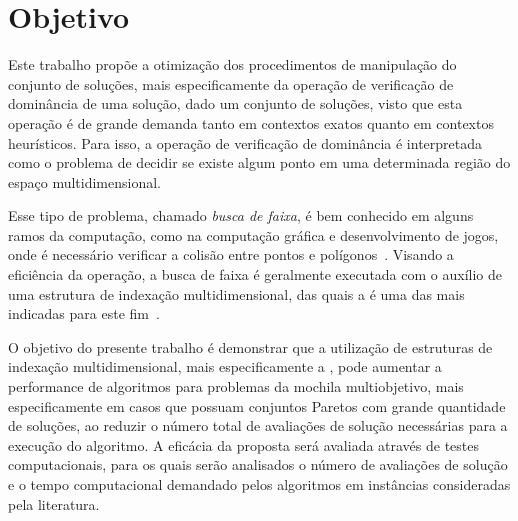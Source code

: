\section{Objetivo}

Este trabalho propõe a otimização dos procedimentos de manipulação do conjunto
de soluções, mais especificamente da operação de verificação de dominância de uma solução,
dado um conjunto de soluções, visto que esta operação é de grande
demanda tanto em contextos exatos quanto em contextos heurísticos.
Para isso, a operação de verificação de dominância é interpretada como
o problema de decidir se existe algum ponto em uma determinada região
do espaço multidimensional.

Esse tipo de problema, chamado \emph{busca de faixa}, é bem conhecido em alguns
ramos da computação, como na computação gráfica e desenvolvimento de jogos,
onde é necessário verificar a colisão entre pontos e polígonos~\cite{sedgewick1988algorithms}.
Visando a eficiência da operação, a busca de faixa é geralmente executada
com o auxílio de uma estrutura de indexação multidimensional,
das quais a \kdtree{} é uma das mais indicadas para este fim~\cite{agarwal1999geometric, sedgewick1988algorithms}.

O objetivo do presente trabalho é demonstrar que a utilização de estruturas
de indexação multidimensional, mais especificamente a \kdtree{}, pode aumentar a performance
de algoritmos para problemas da mochila multiobjetivo, mais especificamente em casos
que possuam conjuntos Paretos com grande quantidade de soluções, ao reduzir
o número total de avaliações de solução necessárias para a execução do algoritmo.
A eficácia da proposta será avaliada através de
testes computacionais, para os quais serão analisados o número de avaliações
de solução e o tempo computacional demandado pelos algoritmos em instâncias
consideradas pela literatura.


